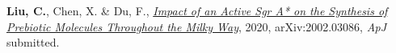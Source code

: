 


\begin{cvpubs}


\cvpub
{ %
\begin{cvitems}
\item {\textbf{Liu, C.}, Chen, X. \& Du, F., \href{https://arxiv.org/pdf/2002.03086.pdf}{\textit{Impact of an Active Sgr A* on the Synthesis of Prebiotic Molecules Throughout the Milky Way}}, 2020, arXiv:2002.03086, \textit{ApJ} submitted.}
\end{cvitems}
}


\end{cvpubs}